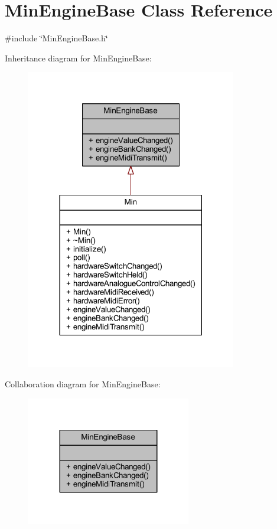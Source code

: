 \hypertarget{class_min_engine_base}{}\section{Min\+Engine\+Base Class Reference}
\label{class_min_engine_base}


{\ttfamily \#include \char`\"{}Min\+Engine\+Base.\+h\char`\"{}}



Inheritance diagram for Min\+Engine\+Base\+:
\nopagebreak
\begin{figure}[H]
\begin{center}
\leavevmode
\includegraphics[width=260pt]{d4/de4/class_min_engine_base__inherit__graph}
\end{center}
\end{figure}


Collaboration diagram for Min\+Engine\+Base\+:
\nopagebreak
\begin{figure}[H]
\begin{center}
\leavevmode
\includegraphics[width=203pt]{d9/d8d/class_min_engine_base__coll__graph}
\end{center}
\end{figure}
